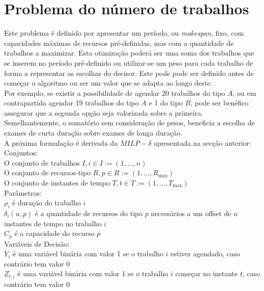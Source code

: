 \section{Problema do número de trabalhos}

Este problema é definido por apresentar um período, ou \textit{makespan}, fixo, com capacidades máximas de recursos pré-definidas, mas com a quantidade de trabalhos a maximizar. Esta otimização poderá ser uma soma dos trabalhos que se inserem no período pré-definido ou utilizar-se um peso para cada trabalho de forma a representar as escolhas do decisor. Este pode pode ser definido antes de começar o algoritmo ou ser um valor que se adapta ao longo deste.\\
Por exemplo, se existir a possibilidade de agendar 20 trabalhos do tipo $A$, ou em contrapartida agendar 19 trabalhos do tipo $A$ e 1 do tipo $B$, pode ser benéfico assegurar que a segunda opção seja valorizada sobre a primeira. Semelhantemente, o somatório sem consideração de pesos, beneficia a escolha de exames de curta duração sobre exames de longa duração.\\

A próxima formulação é derivada da $MILP-\delta$ apresentada na secção anterior:\\

Conjuntos:\\
O conjunto de trabalhos $I, i \in I := (1, \ldots, n)$ \\
O conjunto de recursos-tipo $R, p \in R := (1, \ldots, R_{\max})$ \\
O conjunto de instantes de tempo $T, t \in T := (1, \ldots, T_{\max})$ \\

Parâmetros:\\
$\rho_{i}$ é duração do trabalho $i$ \\
$\delta_{i}(u,p)$ é a quantidade de recursos do tipo $p$ necessários a um offset de $u$ instantes de tempo no trabalho $i$\\
$C_{p}$ é a capacidade do recurso $p$ \\

Variáveis de Decisão: \\
$Y_{i}$ é uma variável binária com valor 1 se o trabalho $i$ estiver agendado, caso contrário tem valor 0 \\
$Z_{t,i}$ é uma variável binária com valor 1 se o trabalho $i$ começar no instante $t$, caso contrário tem valor 0 \\

